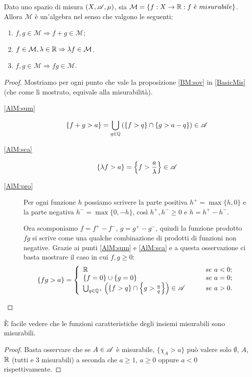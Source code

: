 \begin{proposition}
	\label{AlgMis}
	Dato uno spazio di misura $(X,\mathscr A,\mu)$, sia $\mathcal{M}=\{f:X\rightarrow \R : f\ \grave{e} \ misurabile\}$.
	Allora $\mathcal{M}$ è un'algebra nel senso che valgono le seguenti:
	\begin{enumerate}[label=(\arabic*),ref=(\arabic*)]
		\item $f,g\in \mathcal{M} \Rightarrow f+g\in \mathcal{M}$; \label{AlM:sum}
		\item $f\in \mathcal{M}, \lambda \in \mathbb R \Rightarrow \lambda f\in \mathcal{M}$. \label{AlM:sca}
		\item $f,g\in \mathcal{M} \Rightarrow fg\in \mathcal{M}$. \label{AlM:pro}
	\end{enumerate}
\end{proposition}
\begin{proof}
	Mostriamo per ogni punto che vale la proposizione \ref{BM:sov} in \cref{BasicMis} (che come lì mostrato, equivale alla misurabilità).
	\begin{description}
	\item[\ref{AlM:sum}] 
	\[
		\{f+g>a\}=\bigcup_{q\in \mathbb Q}\left(\{f>q\}\cap\{g>a-q\}\right)\in \mathscr A
	\]
	\item[\ref{AlM:sca}]
	\[
		\{\lambda f>a\}=\left\{f>\frac{a}{\lambda}\right\}\in \mathscr A
	\]
	\item[\ref{AlM:pro}] Per ogni funzione $h$ possiamo scrivere la parte positiva $h^+ = \max\{h,0\}$ e la parte negativa $h^- = \max\{0,-h\}$,
	così $h^+,h^- \geq 0$ e $h = h^+ - h^-$. 
	
	Ora scomponiamo $f=f^+ - f^-$, $g=g^+- g^-$, quindi la funzione prodotto $fg$ si scrive come una qualche combinazione di prodotti di funzioni non negative. Grazie ai punti \ref{AlM:sum} e \ref{AlM:sca} e a questa osservazione ci basta mostrare il caso in cui $f,g\geq0$:
	\[
		\{fg>a\}=\left\{\begin{array}{ll}
			\mathbb R &\qquad se\ a<0;\\
			\{f=0\}\cup\{g=0\} &\qquad se\ a=0;\\
			\bigcup_{q\in \mathbb Q^+}\left(\{f>q\}\cap\left\{g>\frac{a}{q}\right\}\right)\in \mathscr A &\qquad se\ a>0.
		\end{array}\right.
	\]
	\end{description}
\end{proof}

\begin{remark}
	\label{CarMis}
	È facile vedere che le funzioni caratteristiche degli insiemi misurabili sono misurabili.
\end{remark}
\begin{proof}
	Basta osservare che se $A\in \mathscr A$ è misurabile, $\{ \chi_A > a\}$ può valere solo $\emptyset$, $A$, $\mathbb R$ (tutti e 3 misurabili) a seconda che
	$a\geq 1$, $a\geq 0$ oppure $a < 0$ rispettivamente.
\end{proof}

